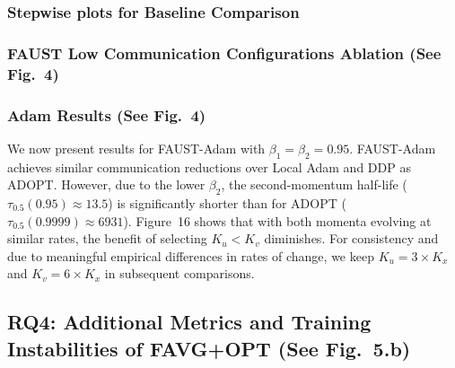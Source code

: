 \documentclass{article}
\begin{document}
\subsubsection{Stepwise plots for Baseline Comparison}
\label{sec:b31_stepwise}



\subsubsection{FAUST Low Communication Configurations Ablation (See Fig.~4)}
\label{sec:b33_ablation}




\subsubsection{Adam Results (See Fig.~4)}
\label{sec:b34_adam_fig4}

We now present results for FAUST-Adam with $\beta_1=\beta_2=0.95$. FAUST-Adam achieves similar communication reductions over Local Adam and DDP as ADOPT. However, due to the lower $\beta_2$, the second-momentum half-life ($\tau_{0.5}(0.95)\approx 13.5$) is significantly shorter than for ADOPT ($\tau_{0.5}(0.9999)\approx 6931$). Figure~16 shows that with both momenta evolving at similar rates, the benefit of selecting $K_u < K_v$ diminishes. For consistency and due to meaningful empirical differences in rates of change, we keep $K_u=3\times K_x$ and $K_v=6\times K_x$ in subsequent comparisons.




\subsection{RQ4: Additional Metrics and Training Instabilities of FAVG+OPT (See Fig.~5.b)}
\label{sec:b4_favgopt}
\end{document}
